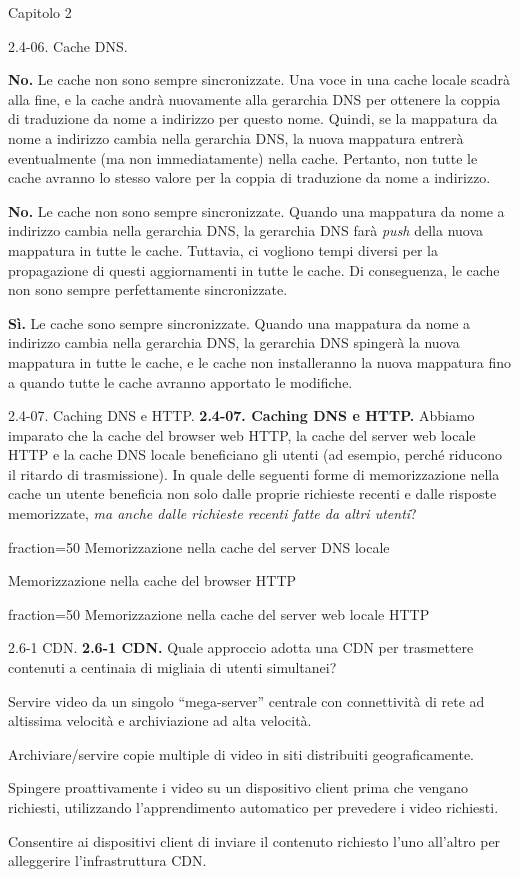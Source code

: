 \documentclass[a4paper]{article}
\begin{document}
\begin{quiz}{Capitolo 2}
\begin{multi}[points=1,shuffle]{2.4-06. Cache DNS.}
\item* \textbf{No.} Le cache non sono sempre sincronizzate. Una voce in una cache locale scadrà alla fine, e la cache andrà nuovamente alla gerarchia DNS per ottenere la coppia di traduzione da nome a indirizzo per questo nome. Quindi, se la mappatura da nome a indirizzo cambia nella gerarchia DNS, la nuova mappatura entrerà eventualmente (ma non immediatamente) nella cache. Pertanto, non tutte le cache avranno lo stesso valore per la coppia di traduzione da nome a indirizzo.
\item \textbf{No.} Le cache non sono sempre sincronizzate. Quando una mappatura da nome a indirizzo cambia nella gerarchia DNS, la gerarchia DNS farà \emph{push} della nuova mappatura in tutte le cache. Tuttavia, ci vogliono tempi diversi per la propagazione di questi aggiornamenti in tutte le cache. Di conseguenza, le cache non sono sempre perfettamente sincronizzate.
\item \textbf{Sì.} Le cache sono sempre sincronizzate. Quando una mappatura da nome a indirizzo cambia nella gerarchia DNS, la gerarchia DNS spingerà la nuova mappatura in tutte le cache, e le cache non installeranno la nuova mappatura fino a quando tutte le cache avranno apportato le modifiche.
\end{multi}

\begin{multi}[points=1,shuffle,multiple]{2.4-07. Caching DNS e HTTP.}
\textbf{2.4-07. Caching DNS e HTTP.}
Abbiamo imparato che la cache del browser web HTTP, la cache del server web locale HTTP e la cache DNS locale beneficiano gli utenti (ad esempio, perché riducono il ritardo di trasmissione). In quale delle seguenti forme di memorizzazione nella cache un utente beneficia non solo dalle proprie richieste recenti e dalle risposte memorizzate, \emph{ma anche dalle richieste recenti fatte da altri utenti}?
\item[fraction=50] Memorizzazione nella cache del server DNS locale
\item Memorizzazione nella cache del browser HTTP
\item[fraction=50] Memorizzazione nella cache del server web locale HTTP
\end{multi}


\begin{multi}[points=1,shuffle]{2.6-1 CDN.}
\textbf{2.6-1 CDN.}
Quale approccio adotta una CDN per trasmettere contenuti a centinaia di migliaia di utenti simultanei?
\item Servire video da un singolo ``mega-server'' centrale con connettività di rete ad altissima velocità e archiviazione ad alta velocità.
\item* Archiviare/servire copie multiple di video in siti distribuiti geograficamente.
\item Spingere proattivamente i video su un dispositivo client prima che vengano richiesti, utilizzando l'apprendimento automatico per prevedere i video richiesti.
\item Consentire ai dispositivi client di inviare il contenuto richiesto l'uno all'altro per alleggerire l'infrastruttura CDN.
\end{multi}



\end{quiz}
\end{document}
